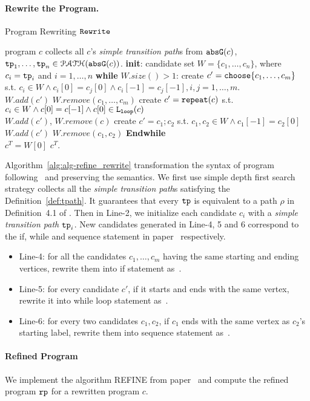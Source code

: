 \paragraph{Rewrite the Program.}
\begin{algorithm}
  \caption{Program Rewriting $\mathtt{Rewrite}$}
  \label{alg:alg-refine_rewrite}
  \begin{algorithmic}[1]
    \REQUIRE program $c$
    \STATE collects all $c$'s \emph{simple transition path}s from $\mathtt{abs}{\mathtt{G}}(c)$, $\mathtt{tp}_1, \ldots, \mathtt{tp}_n \in \mathcal{PATH}(\mathtt{abs}{\mathtt{G}}(c))$.
    \STATE \textbf{init}: candidate set $W = \{c_1, \ldots, c_n\}$, where $c_i = \mathtt{tp}_i$ and $i = 1, \ldots, n$
    \STATE \textbf{while} $W.size()> 1$:
    \STATE \quad create $c' = \rpchoose{c_1, \ldots, c_m}$ 
    s.t. $c_i \in W \land c_i[0] = c_j[0] \land c_i[-1] = c_j[-1], i, j = 1, \ldots, m$.
    \\ \quad $W.add(c')$ \qquad $W.remove(c_1, \ldots, c_m)$
    \STATE
    \quad create $c' = \mathtt{repeat}(c)$ s.t. $c_i \in W \land c[0] = c[-1] \land c[0] \in \mathtt{L}_{\mathtt{loop}}(c)$
    \\ \quad $W.add(c')$, \qquad $W.remove(c)$
    \STATE \quad create $c' = c_1; c_2$ s.t. $c_1, c_2 \in W \land c_1[-1] = c_2[0]$
    \\
    \quad $W.add(c')$ \qquad $W.remove(c_1, c_2)$
    \STATE \textbf{Endwhile}
    \\ $c^T = W[0]$
    \RETURN $c^T$.
\end{algorithmic}
\end{algorithm}
%
Algorithm~\ref{alg:alg-refine_rewrite} transformation the syntax of program following~\cite{GulwaniJK09} and preserving the semantics.
We first use simple depth first search strategy collects all the \emph{simple transition path}s satisfying the Definition~\ref{def:tpath}. It guarantees that every $\mathtt{tp}$ is equivalent to a path $\rho$ in Definition~4.1 of \cite{GulwaniJK09}.
Then
in Line-2, we initialize each candidate $c_i$ with a \emph{simple transition path} $\mathtt{tp}_i$. New candidates generated in Line-4, 5 and 6 correspond to the if,
while and sequence statement in paper~\cite{GulwaniJK09} respectively.
\begin{itemize}
  \item
  Line-4: for all the candidates $c_1, \ldots, c_m$ having the same starting and ending vertices, rewrite them into if statement as~\cite{GulwaniJK09}.
  \item
  Line-5: for every candidate $c'$, if it starts and ends with the same vertex, rewrite it into while loop statement as~\cite{GulwaniJK09}.
  \item
  Line-6: for every two candidates $c_1, c_2$, if $c_1$ ends with the same vertex as $c_2$'s starting label, rewrite them into sequence statement as~\cite{GulwaniJK09}.
\end{itemize}
\paragraph{Refined Program}
We implement the algorithm REFINE from paper~\cite{GulwaniJK09} and compute the 
refined program $\mathtt{rp}$ for a rewritten program $c$.
